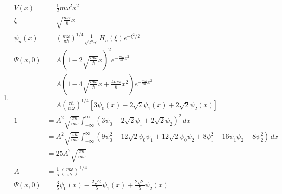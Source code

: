 \documentclass{article}
\begin{document}
\begin{enumerate}
  \item

        \begin{align*}
          V(x)       & = \frac{1}{2} m \omega^2 x^2                                                                                                                                                          \\
          \xi        & = \sqrt{\frac{m \omega}{\hbar}} x                                                                                                                                                     \\
          \psi_n(x)  & = \left( \frac{m \omega}{\pi \hbar} \right)^{1 / 4} \frac{1}{\sqrt{2^n n!}} H_n(\xi) e^{-\xi^2 / 2}                                                                                   \\
          \Psi(x, 0) & = A \left( 1 - 2 \sqrt{\frac{m \omega}{\hbar}} x \right)^2 e^{-\frac{m \omega}{2 \hbar} x^2}                                                                                          \\
                     & = A \left( 1 - 4 \sqrt{\frac{m \omega}{\hbar}} x + \frac{4 m \omega}{\hbar} x^2 \right) e^{-\frac{m \omega}{2 \hbar} x^2}                                                             \\
                     & = A \left( \frac{\pi \hbar}{m \omega} \right)^{1 / 4} \left[ 3 \psi_0(x) - 2 \sqrt{2} \psi_1(x) + 2 \sqrt{2} \psi_2(x) \right]                                                        \\
          1          & = A^2 \sqrt{\frac{\pi \hbar}{m \omega}} \int_{-\infty}^\infty (3 \psi_0 - 2 \sqrt{2} \psi_1 + 2 \sqrt{2} \psi_2)^2 \,d x                                                              \\
                     & = A^2 \sqrt{\frac{\pi \hbar}{m \omega}} \int_{-\infty}^\infty (9 \psi_0^2 - 12 \sqrt{2} \psi_0 \psi_1 + 12 \sqrt{2} \psi_0 \psi_2 + 8 \psi_1^2 - 16 \psi_1 \psi_2 + 8 \psi_2^2) \,d x \\
                     & = 25 A^2 \sqrt{\frac{\pi \hbar}{m \omega}}                                                                                                                                            \\
          A          & = \frac{1}{5} \left( \frac{m \omega}{\pi \hbar} \right)^{1 / 4}                                                                                                                       \\
          \Psi(x, 0) & = \frac{3}{5} \psi_0(x) - \frac{2 \sqrt{2}}{5} \psi_1(x) + \frac{2 \sqrt{2}}{5} \psi_2(x)                                                                                             \\
        \end{align*}


\end{enumerate}
\end{document}
